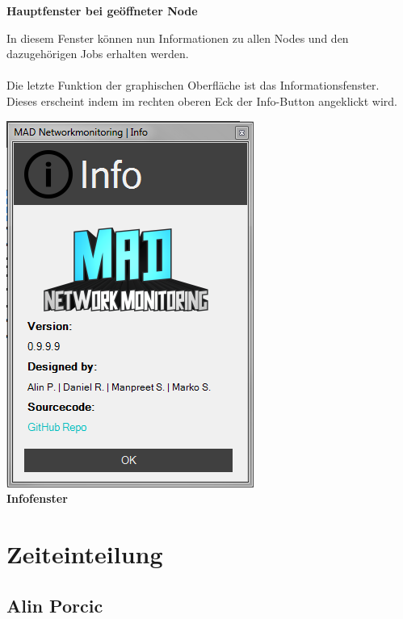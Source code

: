 \documentclass[12pt,a4paper]{report}
\begin{document}
\begin{onehalfspace}
\begin{center}
\textbf{Hauptfenster bei geöffneter Node}
\end{center}
In diesem Fenster können nun Informationen zu allen Nodes und den dazugehörigen Jobs erhalten werden.\\\\
Die letzte Funktion der graphischen Oberfläche ist das Informationsfenster. Dieses erscheint indem im rechten oberen Eck der Info-Button angeklickt wird.
\begin{center}
\includegraphics[scale=0.6]{../docs/lyaton/graphics/GUI_v3_info.png}\\
\textbf{Infofenster}
\end{center}
\part{Zeiteinteilung}

\chapter{Alin Porcic}

\begin{center}
\begin{tabular}{|l|c|l|}


\end{tabular}
\end{center}
\end{onehalfspace}
\end{document}
